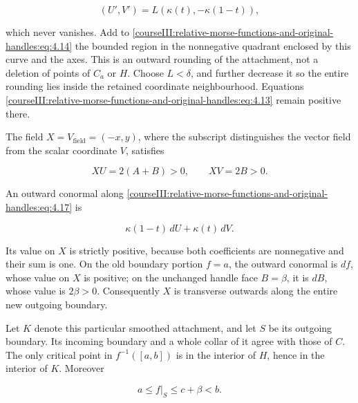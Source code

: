 \begin{equation}
(U',V')=L(\kappa(t),-\kappa(1-t)),
\label{courseIII:relative-morse-functions-and-original-handles:eq:4.18}
\end{equation}

which never vanishes. Add to \eqref{courseIII:relative-morse-functions-and-original-handles:eq:4.14} the bounded region in the nonnegative quadrant enclosed by this curve and the axes. This is an outward rounding of the attachment, not a deletion of points of \(C_a\) or \(H\). Choose \(L<\delta\), and further decrease it so the entire rounding lies inside the retained coordinate neighbourhood. Equations \eqref{courseIII:relative-morse-functions-and-original-handles:eq:4.13} remain positive there.

The field \(X=V_{\mathrm{field}}=(-x,y)\), where the subscript distinguishes the vector field from the scalar coordinate \(V\), satisfies

\begin{equation}
XU=2(A+B)>0,\qquad XV=2B>0.
\label{courseIII:relative-morse-functions-and-original-handles:eq:4.19}
\end{equation}

An outward conormal along \eqref{courseIII:relative-morse-functions-and-original-handles:eq:4.17} is

\begin{equation}
\kappa(1-t)\,dU+\kappa(t)\,dV.
\label{courseIII:relative-morse-functions-and-original-handles:eq:4.20}
\end{equation}

Its value on \(X\) is strictly positive, because both coefficients are nonnegative and their sum is one. On the old boundary portion \(f=a\), the outward conormal is \(df\), whose value on \(X\) is positive; on the unchanged handle face \(B=\beta\), it is \(dB\), whose value is \(2\beta>0\). Consequently \(X\) is transverse outwards along the entire new outgoing boundary.

Let \(K\) denote this particular smoothed attachment, and let \(S\) be its outgoing boundary. Its incoming boundary and a whole collar of it agree with those of \(C\). The only critical point in \(f^{-1}([a,b])\) is in the interior of \(H\), hence in the interior of \(K\). Moreover

\begin{equation}
a\leq f|_S\leq c+\beta<b.
\label{courseIII:relative-morse-functions-and-original-handles:eq:4.21}
\end{equation}

